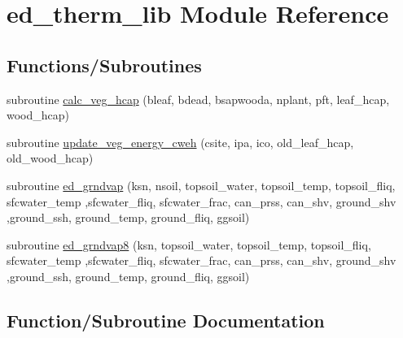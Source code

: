\hypertarget{namespaceed__therm__lib}{}\section{ed\+\_\+therm\+\_\+lib Module Reference}
\label{namespaceed__therm__lib}
\subsection*{Functions/\+Subroutines}
\begin{DoxyCompactItemize}
\item 
subroutine \hyperlink{namespaceed__therm__lib_a882f2cd5f4a75f8c01d2167f45afebb7}{calc\+\_\+veg\+\_\+hcap} (bleaf, bdead, bsapwooda, nplant, pft, leaf\+\_\+hcap, wood\+\_\+hcap)
\item 
subroutine \hyperlink{namespaceed__therm__lib_ae2a805729a52bf5814d2c3a0d84f6fe8}{update\+\_\+veg\+\_\+energy\+\_\+cweh} (csite, ipa, ico, old\+\_\+leaf\+\_\+hcap, old\+\_\+wood\+\_\+hcap)
\item 
subroutine \hyperlink{namespaceed__therm__lib_ad7497e216325854214ab9dd57a26f6ee}{ed\+\_\+grndvap} (ksn, nsoil, topsoil\+\_\+water, topsoil\+\_\+temp, topsoil\+\_\+fliq, sfcwater\+\_\+temp                                                                                                   ,sfcwater\+\_\+fliq, sfcwater\+\_\+frac, can\+\_\+prss, can\+\_\+shv, ground\+\_\+shv                                                                                                                                   ,ground\+\_\+ssh, ground\+\_\+temp, ground\+\_\+fliq, ggsoil)
\item 
subroutine \hyperlink{namespaceed__therm__lib_aeb9ec19b3f02291df9155b6204fecf9e}{ed\+\_\+grndvap8} (ksn, topsoil\+\_\+water, topsoil\+\_\+temp, topsoil\+\_\+fliq, sfcwater\+\_\+temp                                                                                                                           ,sfcwater\+\_\+fliq, sfcwater\+\_\+frac, can\+\_\+prss, can\+\_\+shv, ground\+\_\+shv                                                                                                                                   ,ground\+\_\+ssh, ground\+\_\+temp, ground\+\_\+fliq, ggsoil)
\end{DoxyCompactItemize}


\subsection{Function/\+Subroutine Documentation}
